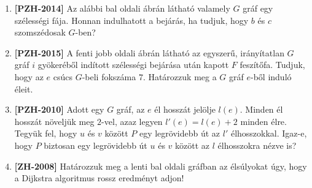 \documentclass[a4paper,12pt]{article}
\begin{document}
\begin{enumerate}
        \item \textbf{[PZH-2014]} Az alábbi bal oldali ábrán látható valamely $G$ gráf egy szélességi fája. Honnan indulhatott a bejárás, ha tudjuk, hogy $b$ és $c$ szomszédosak $G$-ben?
        
        \begin{minipage}{6in}
            \centering
            \raisebox{-0.5\height}{} \hspace{1in}
            \raisebox{-0.5\height}{}
        \end{minipage}
        
        \item \textbf{[PZH-2015]} A fenti jobb oldali ábrán látható az egyszerű, irányítatlan $G$ gráf $i$ gyökeréből indított szélességi bejárása után kapott $F$ feszítőfa. Tudjuk, hogy az $e$ csúcs $G$-beli fokszáma $7$. Határozzuk meg a $G$ gráf $e$-ből induló éleit.


        \item \textbf{[PZH-2010]} Adott egy $G$ gráf, az $e$ él hosszát jelölje $l(e)$. Minden él hosszát növeljük meg $2$-vel, azaz legyen $l'(e)=l(e)+2$ minden élre. Tegyük fel, hogy $u$ és $v$ között $P$ egy legrövidebb út az $l'$ élhosszokkal. Igaz-e, hogy $P$ biztosan egy legrövidebb út $u$ és $v$ között az $l$ élhosszokra nézve is?
        
        
        
        \item \textbf{[ZH-2008]} Határozzuk meg a lenti bal oldali gráfban az élsúlyokat úgy, hogy a Dijkstra algoritmus rossz eredményt adjon!
        \begin{figure}[h]
            \centering
            \begin{subfigure}{0.4\textwidth}
                \centering
                
            \end{subfigure}
        \end{figure}


\end{enumerate}
\end{document}
